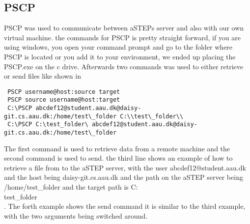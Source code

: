 \subsection{PSCP}
PSCP was used to communicate between aSTEPs server and also with our own virtual machine. the commands for PSCP is pretty straight forward, if you are using windows, you open your command prompt and go to the folder where PSCP is located or you add it to your environment, we ended up placing the PSCP.exe on the c drive. Afterwards two commands was used to either retrieve or send files like shown in 

\begin{lstlisting}
 PSCP username@host:source target
 PSCP source username@host:target
 C:\PSCP abcdef12@student.aau.dk@daisy-git.cs.aau.dk:/home/test\_folder C:\\test\_folder\\
 C:\PSCP C:\test_folder\ abcdef12@student.aau.dk@daisy-git.cs.aau.dk:/home/test\_folder
\end{lstlisting}

The first command is used to retrieve data from a remote machine and the second command is used to send. the third line shows an example of how to retrieve a file from to the aSTEP server, with the user abcdef12@student.aau.dk and the host being daisy-git.cs.aau.dk and the path on the aSTEP server being /home/test\_folder and the target path is C:\\test\_folder\\. The forth example shows the send command it is similar to the third example, with the two arguments being switched around. 


